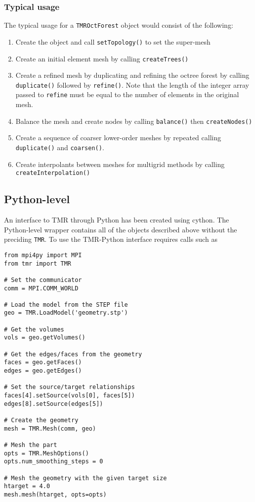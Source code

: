 \documentclass[12pt]{article}
\begin{document}
\subsubsection{Typical usage}

The typical usage for a \texttt{TMROctForest} object would consist of the following:
\begin{enumerate}
\item Create the object and call \texttt{setTopology()} to set the super-mesh
\item Create an initial element mesh by calling \texttt{createTrees()}
\item Create a refined mesh by duplicating and refining the octree forest by calling \texttt{duplicate()} followed by \texttt{refine()}. Note that the length of the integer array passed to \texttt{refine} must be equal to the number of elements in the original mesh.
\item Balance the mesh and create nodes by calling \texttt{balance()} then \texttt{createNodes()}
\item Create a sequence of coarser lower-order meshes by repeated calling \texttt{duplicate()} and \texttt{coarsen()}.
\item Create interpolants between meshes for multigrid methods by calling \texttt{createInterpolation()}
\end{enumerate}

\subsection{Python-level}

An interface to TMR through Python has been created using cython.
The Python-level wrapper contains all of the objects described above without the preciding \texttt{TMR}. 
To use the TMR-Python interface requires calls such as
\begin{verbatim}
from mpi4py import MPI
from tmr import TMR

# Set the communicator
comm = MPI.COMM_WORLD

# Load the model from the STEP file
geo = TMR.LoadModel('geometry.stp')

# Get the volumes
vols = geo.getVolumes()

# Get the edges/faces from the geometry
faces = geo.getFaces()
edges = geo.getEdges()

# Set the source/target relationships
faces[4].setSource(vols[0], faces[5])
edges[8].setSource(edges[5])

# Create the geometry
mesh = TMR.Mesh(comm, geo)

# Mesh the part
opts = TMR.MeshOptions()
opts.num_smoothing_steps = 0

# Mesh the geometry with the given target size
htarget = 4.0
mesh.mesh(htarget, opts=opts)
\end{verbatim}
\end{document}
